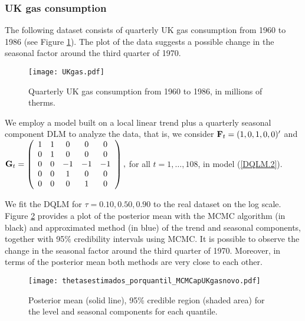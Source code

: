 \documentclass[12pt,a4paper]{article}\usepackage[]{graphicx}\usepackage[]{color}\usepackage{subfigure}
\begin{document}
\subsubsection{UK gas consumption}

The following dataset consists of quarterly UK gas consumption from 1960 to 1986 (see Figure \ref{UKgas_data}). The plot of the data suggests a
possible change in the seasonal factor around the third quarter of 1970.
\begin{figure}[h!]
\begin{center}
\texttt{[image: UKgas.pdf]}\\ %
\end{center}
\vspace{-1 cm}\caption{Quarterly UK gas consumption from 1960 to 1986, in millions of
therms.}\label{UKgas_data}
\end{figure}

We employ a model built on a local linear trend plus a quarterly seasonal component DLM to analyze the data, that is, 
we consider ${\bf F}_t=(1,0,1,0, 0)'$ and ${\bf G}_t= \left( \begin{array}{c c c c c} 
 1 & 1&  0&  0 & 0 \\ 
 0 & 1 & 0 & 0 & 0\\ 
 0 & 0 & -1 & -1 & -1\\
  0 & 0 &  1 & 0 & 0\\  
  0 & 0 &  0 & 1 & 0\\
  \end{array} \right),$ for all $t=1,\dots,108$, in model (\ref{DQLM.2}).
  
We fit the DQLM for $\tau=0.10, 0.50, 0.90$ to the real dataset on the log scale. Figure \ref{thetas_UKgas} provides a plot of the posterior mean with the MCMC algorithm (in black) and approximated method (in blue) of the trend and seasonal components, together with 95\% credibility intervals 
using MCMC. It is possible to observe the change in the seasonal factor around the third quarter of 1970. Moreover, in terms of the posterior mean 
both methods are very close to each other.
\clearpage

 
\begin{figure}[h!]
\begin{center}
\texttt{[image: thetasestimados\_porquantil\_MCMCapUKgasnovo.pdf]} %
\end{center}
\vspace{-0.9 cm}\caption{Posterior mean (solid line), 95\% credible region (shaded area) for the level and seasonal 
components for each quantile.}\label{thetas_UKgas}
\end{figure}
\end{document}
